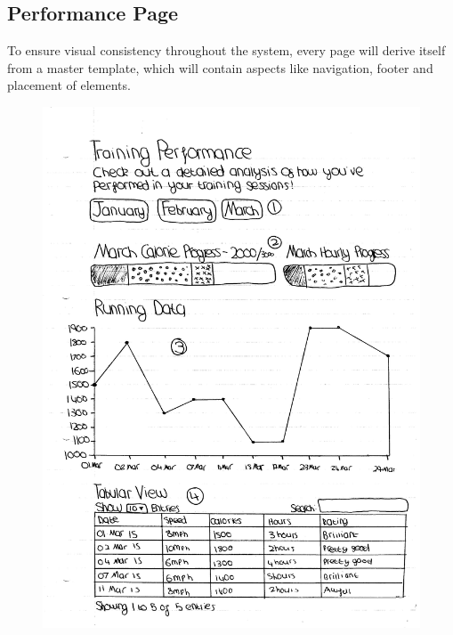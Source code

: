\documentclass{article}[12pt,a4paper]
\begin{document}
\subsection{Performance Page}
To ensure visual consistency throughout the system, every page will derive itself from a master template, which will contain aspects like navigation, footer and placement of elements.

\begin{figure}[h!]
  \includegraphics[scale=0.55]{design_ui/user_performance}
\end{figure}
\clearpage
\end{document}
